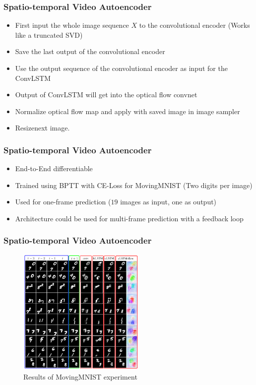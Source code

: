  \begin{frame}
   \frametitle{Spatio-temporal Video Autoencoder}
   
   \begin{itemize}
    \item<1-> First input the whole image sequence $X$ to the convolutional encoder (Works like a truncated SVD)
    \item<2-> Save the last output of the convolutional encoder
    \item<3-> Use the output sequence of the convolutional encoder as input for the ConvLSTM
    \item<4-> Output of ConvLSTM will get into the optical flow convnet
    \item<5-> Normalize optical flow map and apply with saved image in image sampler
    \item<6-> \glqq Resize\grqq next image.
   \end{itemize}
  
  \end{frame}
  \begin{frame}
   \frametitle{Spatio-temporal Video Autoencoder}
   
   \begin{itemize}
    \item<1-> End-to-End differentiable
	\item<2-> Trained using BPTT with CE-Loss for MovingMNIST (Two digits per image)
	\item<3-> Used for one-frame prediction ($19$ images as input, one as output)
	\item<4-> Architecture could be used for multi-frame prediction with a feedback loop
   \end{itemize}
  
  \end{frame}
  \begin{frame}
   \frametitle{Spatio-temporal Video Autoencoder}  
  
   \begin{figure}[H]
    \includegraphics[width=0.55\textwidth]{../Images/patraucean_results_mnist.png}
    \centering
    \caption{Results of MovingMNIST experiment \citep{Patraucean2015}}
    \label{fig:lstm_architecture}
   \end{figure}  
  
  \end{frame}
 
